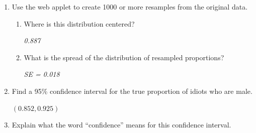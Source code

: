\begin{enumerate}
\begin{enumerate}
\begin{enumerate}
\begin{key} 
  {$0.887$}
\end{key}
       \item After resampling 318 individuals, what number do you compute?
\begin{students}
    \vspace{1.2cm}    
\end{students}

\begin{key} 
  {\it  The proportion of the 318 new draws which are male.}
\end{key}
     \end{enumerate}
     \item Use the  web applet to create  1000 or more
       resamples from the original data. 
       \begin{enumerate}
         \item Where is this distribution centered?
\begin{students}
    \vspace{.7cm}    
\end{students}

\begin{key} 
  {\it  0.887}
\end{key}
         \item What is the spread of the distribution of resampled proportions?
\begin{students}
    \vspace{.7cm}    
\end{students}

\begin{key} 
  {\it SE =  0.018}
\end{key}
         \end{enumerate}
     \item Find a 95\% confidence interval for the true proportion of
       idiots who are male.
\begin{students}
    \vspace{1.2cm}    
\end{students}

\begin{key} 
  $  (0.852, 0.925)$
\end{key}
     \item \label{longRun}Explain what the word ``confidence'' means for this
       confidence interval.
\begin{students}
    \vspace{3cm}    
\end{students}


\end{enumerate}
\end{enumerate}
